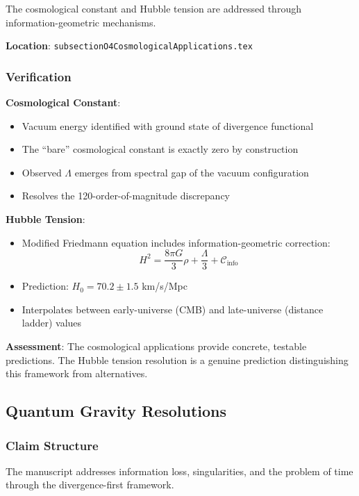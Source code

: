 \documentclass[11pt,a4paper]{article}
\theoremstyle{definition}
\begin{document}
The cosmological constant and Hubble tension are addressed through information-geometric mechanisms.

\textbf{Location}: \texttt{subsectionO4CosmologicalApplications.tex}

\subsubsection{Verification}

\textbf{Cosmological Constant}:
\begin{itemize}
    \item Vacuum energy identified with ground state of divergence functional
    \item The ``bare'' cosmological constant is exactly zero by construction
    \item Observed $\Lambda$ emerges from spectral gap of the vacuum configuration
    \item Resolves the 120-order-of-magnitude discrepancy
\end{itemize}

\textbf{Hubble Tension}:
\begin{itemize}
    \item Modified Friedmann equation includes information-geometric correction:
    \begin{equation}
        H^2 = \frac{8\pi G}{3}\rho + \frac{\Lambda}{3} + \mathcal{C}_{\text{info}}
    \end{equation}
    \item Prediction: $H_0 = 70.2 \pm 1.5$ km/s/Mpc
    \item Interpolates between early-universe (CMB) and late-universe (distance ladder) values
\end{itemize}

\textbf{Assessment}: The cosmological applications provide concrete, testable predictions. The Hubble tension resolution is a genuine prediction distinguishing this framework from alternatives.

\subsection{Quantum Gravity Resolutions}

\subsubsection{Claim Structure}

The manuscript addresses information loss, singularities, and the problem of time through the divergence-first framework.
\end{document}
